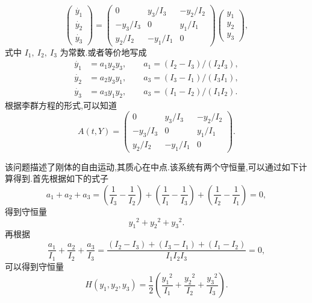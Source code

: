 \begin{equation*}
  	\begin{pmatrix}
  		\dot{y_1}\\ \dot{y_2}\\ \dot{y_3}
  	\end{pmatrix}=
  	\begin{pmatrix}
  		0&y_3/I_3&-y_2/I_2\\
  		-y_3/I_3&0&y_1/I_1\\
  		y_2/I_2&-y_1/I_1&0
  	\end{pmatrix}
  	\begin{pmatrix}
  	y_1\\ y_2\\ y_3
  	\end{pmatrix},
 \end{equation*}
式中 $I_1,~I_2,~I_3$ 为常数.或者等价地写成
\begin{equation*}
  	\begin{aligned}
  		\dot{y_1}&=a_1 y_2 y_3,\qquad a_1=(I_2-I_3)/(I_2I_3),\\
  		\dot{y_2}&=a_2 y_3 y_1,\qquad a_3=(I_3-I_1)/(I_3I_1),\\
  		\dot{y_3}&=a_3 y_1 y_2,\qquad a_3=(I_1-I_2)/(I_1I_2).
  	\end{aligned}
\end{equation*}
根据李群方程的形式,可以知道
\begin{equation*}
  	A(t,Y)=
  	\begin{pmatrix}
  		0&y_3/I_3&-y_2/I_2\\
  		-y_3/I_3&0&y_1/I_1\\
  		y_2/I_2&-y_1/I_1&0
  	\end{pmatrix}.
 \end{equation*}

该问题描述了刚体的自由运动,其质心在中点.该系统有两个守恒量,可以通过如下计算得到.首先根据如下的式子
\begin{equation*}
	a_1+a_2+a_3=(\frac{1}{I_3}-\frac{1}{I_2})+(\frac{1}{I_1}-\frac{1}{I_3})+(\frac{1}{I_2}-\frac{1}{I_1})=0,
\end{equation*}
得到守恒量
\begin{equation*}
	{y_1}^2+{y_2}^2+{y_3}^2.
\end{equation*}
再根据
\begin{equation*}
	\frac{a_1}{I_1}+\frac{a_2}{I_2}+\frac{a_3}{I_3}=\frac{(I_2-I_3)+(I_3-I_1)+(I_1-I_2)}{I_1I_2I_3}=0,
\end{equation*}
可以得到守恒量
\begin{equation*}
	H(y_1,y_2,y_3)=\frac{1}{2}(\frac{{y_1}^2}{I_1}+\frac{{y_2}^2}{I_2}+\frac{{y_3}^2}{I_3}).
\end{equation*}

